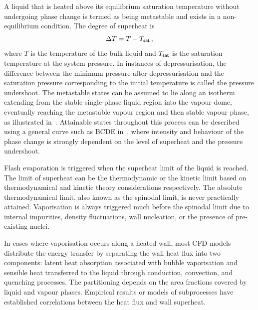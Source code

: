 A liquid that is heated 
above its equilibrium saturation temperature without undergoing phase change 
is termed as being metastable and exists in a non-equilibrium condition. The degree of superheat is 
\begin{equation}
  \Delta T  =  T - T_{\mathsf {sat}}\,,
\end{equation}
where \(T\) is the temperature of the bulk liquid and \(T_{\mathsf {sat}}\) is the 
saturation temperature at the system pressure. 
In instances of depressurisation, the difference between
the minimum pressure after depressurisation and the saturation pressure corresponding
to the initial temperature is called the pressure undershoot. The metastable states can be assumed to lie 
along an isotherm extending from the stable single-phase liquid region into the vapour dome, 
eventually reaching the metastable vapour region and then stable vapour phase, as illustrated in~.
Attainable states throughout this process can be described using a general curve such as BCDE in~,
where intensity and behaviour
of the phase change is strongly dependent on 
the level of superheat and the pressure undershoot.~\cite{wickertSimulation, pinhasiModelingFlashingTwoPhase2005,carey2020}

Flash evaporation is triggered when the superheat limit of the liquid is reached.
The limit of superheat can be the thermodynamic or the kinetic limit based
on thermodynamical and kinetic theory considerations respectively. 
The absolute thermodynamical limit, also known as the spinodal limit, is never
practically attained. Vaporisation is always triggered much before the spinodal limit due to 
internal impurities, density fluctuations, wall nucleation, or  the presence of 
pre-existing nuclei.~\cite{pinhasiModelingFlashingTwoPhase2005,carey2020, liaoComputationalModellingFlash2017}

In cases where vaporisation occurs along a heated wall, most CFD models distribute the energy 
transfer by separating the wall heat flux into two components: 
latent heat absorption associated with bubble vaporisation and 
sensible heat transferred to the liquid through conduction, 
convection, and quenching processes. The partitioning depends on 
the area fractions covered by liquid and vapour phases.
Empirical results or models of subprocesses have 
established correlations between the heat flux and wall superheat.~\cite{gilmanDevelopmentGeneralPurpose2014,ghiaasiaanTwoPhaseFlowBoiling2007}


